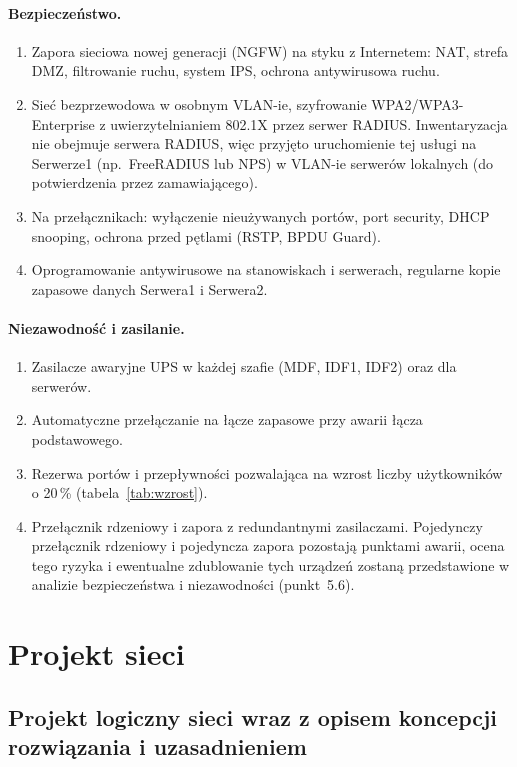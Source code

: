 \documentclass[12pt,a4paper]{article}
\begin{document}
\paragraph{Bezpieczeństwo.}
\begin{enumerate}[resume]
  \item Zapora sieciowa nowej generacji (NGFW) na styku z Internetem: NAT,
  strefa DMZ, filtrowanie ruchu, system IPS, ochrona antywirusowa ruchu.
  \item Sieć bezprzewodowa w osobnym VLAN-ie, szyfrowanie WPA2/WPA3-Enterprise
  z uwierzytelnianiem 802.1X przez serwer RADIUS. Inwentaryzacja nie
  obejmuje serwera RADIUS, więc przyjęto uruchomienie tej usługi na Serwerze1
  (np.\ FreeRADIUS lub NPS) w VLAN-ie serwerów lokalnych (do potwierdzenia
  przez zamawiającego).
  \item Na przełącznikach: wyłączenie nieużywanych portów, port security,
  DHCP snooping, ochrona przed pętlami (RSTP, BPDU Guard).
  \item Oprogramowanie antywirusowe na stanowiskach i serwerach, regularne
  kopie zapasowe danych Serwera1 i Serwera2.
\end{enumerate}

\paragraph{Niezawodność i zasilanie.}
\begin{enumerate}[resume]
  \item Zasilacze awaryjne UPS w każdej szafie (MDF, IDF1, IDF2) oraz dla
  serwerów.
  \item Automatyczne przełączanie na łącze zapasowe przy awarii łącza
  podstawowego.
  \item Rezerwa portów i przepływności pozwalająca na wzrost liczby
  użytkowników o 20\,\% (tabela~\ref{tab:wzrost}).
  \item Przełącznik rdzeniowy i zapora z redundantnymi zasilaczami.
  Pojedynczy przełącznik rdzeniowy i pojedyncza zapora pozostają punktami
  awarii, ocena tego ryzyka i ewentualne zdublowanie tych urządzeń zostaną
  przedstawione w analizie bezpieczeństwa i niezawodności (punkt~5.6).
\end{enumerate}

\section{Projekt sieci}

\subsection{Projekt logiczny sieci wraz z opisem koncepcji rozwiązania i uzasadnieniem}
\end{document}
